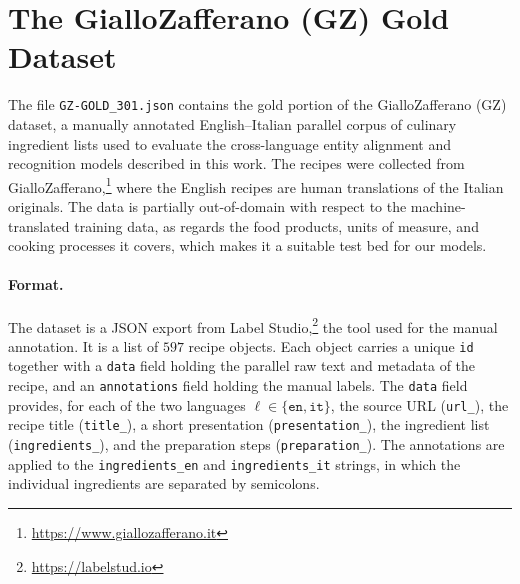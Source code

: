 %
%
% 
% 
% 

\section{The GialloZafferano (GZ) Gold Dataset}
\label{sec:gz-gold}

The file \texttt{GZ-GOLD\_301.json} contains the gold portion of the
GialloZafferano (GZ) dataset, a manually annotated English--Italian parallel
corpus of culinary ingredient lists used to evaluate the cross-language entity
alignment and recognition models described in this work. The recipes were
collected from GialloZafferano,\footnote{\url{https://www.giallozafferano.it}}
where the English recipes are human translations of the Italian originals. The
data is partially out-of-domain with respect to the machine-translated training
data, as regards the food products, units of measure, and cooking processes it
covers, which makes it a suitable test bed for our models.

\paragraph{Format.}
The dataset is a JSON export from Label
Studio,\footnote{\url{https://labelstud.io}} the tool used for the manual
annotation. It is a list of $597$ recipe objects. Each object carries a unique
\texttt{id} together with a \texttt{data} field holding the parallel raw text
and metadata of the recipe, and an \texttt{annotations} field holding the
manual labels. The \texttt{data} field provides, for each of the two languages
$\ell \in \{\texttt{en}, \texttt{it}\}$, the source URL (\texttt{url\_\ell}),
the recipe title (\texttt{title\_\ell}), a short presentation
(\texttt{presentation\_\ell}), the ingredient list (\texttt{ingredients\_\ell}),
and the preparation steps (\texttt{preparation\_\ell}). The annotations are
applied to the \texttt{ingredients\_en} and \texttt{ingredients\_it} strings,
in which the individual ingredients are separated by semicolons.

